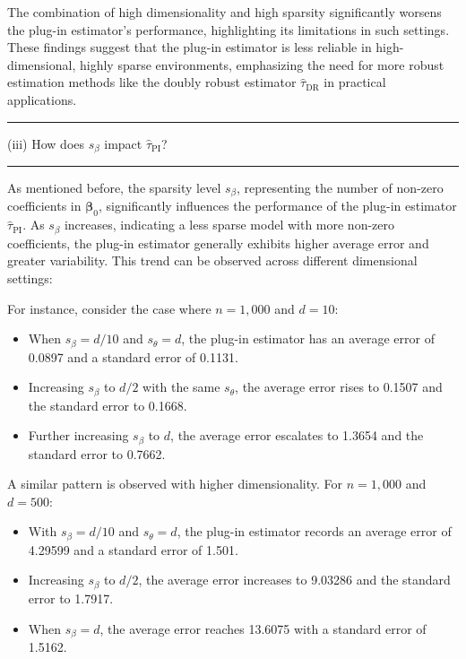 \documentclass{article}
\newenvironment{colorparagraph}[1]{\par\color{#1}}{\par}
\begin{document}
The combination of high dimensionality and high sparsity significantly worsens the plug-in estimator's performance, highlighting its limitations in such settings. These findings suggest that the plug-in estimator is less reliable in high-dimensional, highly sparse environments, emphasizing the need for more robust estimation methods like the doubly robust estimator \( \hat{\tau}_{\text{DR}} \) in practical applications.

\begin{colorparagraph}{questioncolor}
  \rule{\textwidth}{0.5pt}
  
  \vspace{.2cm}
(iii) How does \( s_\beta \) impact \( \hat{\tau}_{\text{PI}} \)?

\rule{\textwidth}{0.5pt}
\end{colorparagraph}

As mentioned before, the sparsity level \( s_\beta \), representing the number of non-zero coefficients in \( \boldsymbol{\beta}_0 \), significantly influences the performance of the plug-in estimator \( \hat{\tau}_{\text{PI}} \). As \( s_\beta \) increases, indicating a less sparse model with more non-zero coefficients, the plug-in estimator generally exhibits higher average error and greater variability. This trend can be observed across different dimensional settings:

For instance, consider the case where \( n = 1,000 \) and \( d = 10 \):
\begin{itemize}
  \item When \( s_\beta = d/10 \) and \( s_\theta = d \), the plug-in estimator has an average error of 0.0897 and a standard error of 0.1131.
  \item Increasing \( s_\beta \) to \( d/2 \) with the same \( s_\theta \), the average error rises to 0.1507 and the standard error to 0.1668.
  \item Further increasing \( s_\beta \) to \( d \), the average error escalates to 1.3654 and the standard error to 0.7662.
\end{itemize}

A similar pattern is observed with higher dimensionality. For \( n = 1,000 \) and \( d = 500 \):
\begin{itemize}
  \item With \( s_\beta = d/10 \) and \( s_\theta = d \), the plug-in estimator records an average error of 4.29599 and a standard error of 1.501.
  \item Increasing \( s_\beta \) to \( d/2 \), the average error increases to 9.03286 and the standard error to 1.7917.
  \item When \( s_\beta = d \), the average error reaches 13.6075 with a standard error of 1.5162.
\end{itemize}
\end{document}

